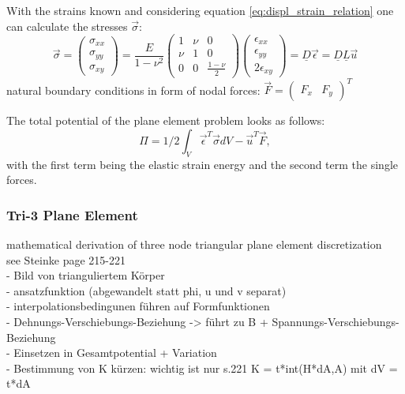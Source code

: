 \documentclass[11pt,twoside]{scrartcl}
\begin{document}
  With the strains known and considering equation \ref{eq:displ_strain_relation} one can calculate the stresses $\vec{\sigma}$:
  \begin{equation}
  \vec{\sigma} = \begin{pmatrix}
  \sigma_{xx} \\
  \sigma_{yy} \\
  \sigma_{xy}
  \end{pmatrix} = \frac{E}{1-\nu^2} \begin{pmatrix}
  1 & \nu & 0 \\
  \nu & 1 & 0 \\
  0 & 0 & \frac{1-\nu}{2}
  \end{pmatrix} \begin{pmatrix}
  \epsilon_{xx} \\
  \epsilon_{yy} \\
  2\epsilon_{xy}
  \end{pmatrix} = \underline{D} \vec{\epsilon} = \underline{D} \underline{L} \vec{u}
  \end{equation}
  natural boundary conditions in form of nodal forces: $\vec{F} = \begin{pmatrix}
  F_x & F_y
  \end{pmatrix}^T$
  
  The total potential of the plane element problem looks as follows:
  \begin{equation}
  \Pi = 1/2 \int_{V}\vec{\epsilon}^T\vec{\sigma}dV - \vec{u}^T \vec{F},
  \end{equation}
  with the first term being the elastic strain energy and the second term the single forces.
  
  \subsubsection{Tri-3 Plane Element}
  mathematical derivation of three node triangular plane element discretization\\
  see Steinke \cite{steinke2005finite} page 215-221\\
  - Bild von trianguliertem Körper\\
  - ansatzfunktion (abgewandelt statt phi, u und v separat)\\
  - interpolationsbedingunen führen auf Formfunktionen\\
  - Dehnungs-Verschiebungs-Beziehung -> führt zu B + Spannungs-Verschiebungs-Beziehung\\
  - Einsetzen in Gesamtpotential + Variation\\
  - Bestimmung von K kürzen: wichtig ist nur s.221 K = t*int(H*dA,A) mit dV = t*dA
\end{document}
